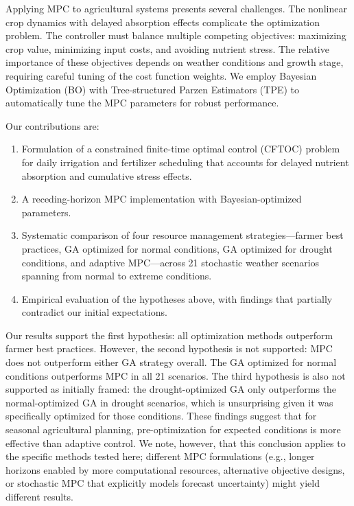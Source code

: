 \documentclass[preprint,12pt]{elsarticle}
\begin{document}
Applying MPC to agricultural systems presents several challenges. The nonlinear crop dynamics with delayed absorption effects complicate the optimization problem. The controller must balance multiple competing objectives: maximizing crop value, minimizing input costs, and avoiding nutrient stress. The relative importance of these objectives depends on weather conditions and growth stage, requiring careful tuning of the cost function weights. We employ Bayesian Optimization (BO) \cite{shahriari2016taking} with Tree-structured Parzen Estimators (TPE) \cite{bergstra2011algorithms} to automatically tune the MPC parameters for robust performance.

Our contributions are:
\begin{enumerate}
\item Formulation of a constrained finite-time optimal control (CFTOC) problem for daily irrigation and fertilizer scheduling that accounts for delayed nutrient absorption and cumulative stress effects.
\item A receding-horizon MPC implementation with Bayesian-optimized parameters.
\item Systematic comparison of four resource management strategies---farmer best practices, GA optimized for normal conditions, GA optimized for drought conditions, and adaptive MPC---across 21 stochastic weather scenarios spanning from normal to extreme conditions.
\item Empirical evaluation of the hypotheses above, with findings that partially contradict our initial expectations.
\end{enumerate}

Our results support the first hypothesis: all optimization methods outperform farmer best practices. However, the second hypothesis is not supported: MPC does not outperform either GA strategy overall. The GA optimized for normal conditions outperforms MPC in all 21 scenarios. The third hypothesis is also not supported as initially framed: the drought-optimized GA only outperforms the normal-optimized GA in drought scenarios, which is unsurprising given it was specifically optimized for those conditions. These findings suggest that for seasonal agricultural planning, pre-optimization for expected conditions is more effective than adaptive control. We note, however, that this conclusion applies to the specific methods tested here; different MPC formulations (e.g., longer horizons enabled by more computational resources, alternative objective designs, or stochastic MPC that explicitly models forecast uncertainty) might yield different results.
\end{document}
